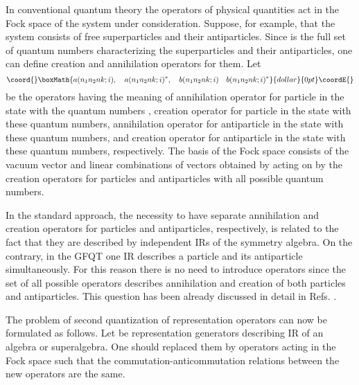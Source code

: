 \documentclass[a4paper,12pt]{article}%
\begin{document}
In conventional quantum theory the operators of 
physical quantities act in the Fock space of the system under 
consideration. Suppose, for example, that the system consists
of free superparticles and their antiparticles.
Since \coordHE{} is the full set of quantum numbers
characterizing the superparticles and their antiparticles, one
can define creation and annihilation operators for them.
Let
$$\coord{}\boxMath{a(n_1n_2nk;i),\quad a(n_1n_2nk;i)^*, 
\quad b(n_1n_2nk;i)\quad b(n_1n_2nk;i)^*}{dollar}{0pt}\coordE{}$$
be the operators having the meaning of annihilation operator 
for particle \coordHE{} in the state with the quantum numbers \coordHE{},
creation operator 
for particle \coordHE{} in the state with these quantum numbers,
annihilation operator 
for antiparticle \coordHE{} in the state with these quantum numbers,
and creation operator 
for antiparticle \coordHE{} in the state with these quantum numbers, respectively.
The basis of the Fock space consists of the vacuum vector \coordHE{} and
linear combinations of vectors obtained by acting on \coordHE{} by 
the creation operators for particles and antiparticles with all
possible quantum numbers.

In the standard approach, the necessity to have separate annihilation
and creation operators for particles and antiparticles, respectively,
is related to the fact that they are described by independent IRs of
the symmetry algebra. On the contrary, in the GFQT one IR describes
a particle and its antiparticle simultaneously. For this reason there
is no need to introduce \coordHE{} operators since the set of all
possible operators \coordHE{} describes annihilation and creation of
both particles and antiparticles. This question has been already
discussed in detail in Refs. \cite{lev2,lev3}.

The problem of second quantization of representation operators can
now be formulated as follows. Let \coordHE{} be representation
generators describing IR of an algebra or superalgebra. One should
replaced them by operators acting in the Fock space such that the
commutation-anticommutation relations between the new operators are
the same. 
\end{document}
